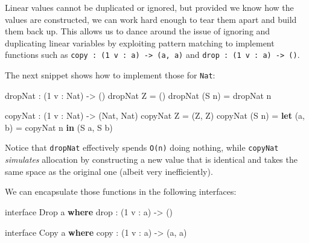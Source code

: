 \documentclass[
]{article}
\newenvironment{Shaded}{}{}
\newcommand{\DataTypeTok}[1]{\textcolor[rgb]{0.56,0.13,0.00}{#1}}
\newcommand{\DecValTok}[1]{\textcolor[rgb]{0.25,0.63,0.44}{#1}}
\newcommand{\FunctionTok}[1]{\textcolor[rgb]{0.02,0.16,0.49}{#1}}
\newcommand{\KeywordTok}[1]{\textcolor[rgb]{0.00,0.44,0.13}{\textbf{#1}}}
\newcommand{\NormalTok}[1]{#1}
\newcommand{\OperatorTok}[1]{\textcolor[rgb]{0.40,0.40,0.40}{#1}}
\newcommand{\OtherTok}[1]{\textcolor[rgb]{0.00,0.44,0.13}{#1}}
\begin{document}
Linear values cannot be duplicated or ignored, but provided we know how
the values are constructed, we can work hard enough to tear them apart
and build them back up. This allows us to dance around the issue of
ignoring and duplicating linear variables by exploiting pattern matching
to implement functions such as
\texttt{copy\ :\ (1\ v\ :\ a)\ -\textgreater{}\ (a,\ a)} and
\texttt{drop\ :\ (1\ v\ :\ a)\ -\textgreater{}\ ()}.

The next snippet shows how to implement those for \texttt{Nat}:

\begin{Shaded}
\begin{Highlighting}[]
\NormalTok{dropNat }\OperatorTok{:}\NormalTok{ (}\DecValTok{1}\NormalTok{ v }\OperatorTok{:} \DataTypeTok{Nat}\NormalTok{) }\OtherTok{{-}\textgreater{}}\NormalTok{ ()}
\NormalTok{dropNat }\DataTypeTok{Z} \OtherTok{=}\NormalTok{ ()}
\NormalTok{dropNat (}\DataTypeTok{S}\NormalTok{ n) }\OtherTok{=}\NormalTok{ dropNat n}

\NormalTok{copyNat }\OperatorTok{:}\NormalTok{ (}\DecValTok{1}\NormalTok{ v }\OperatorTok{:} \DataTypeTok{Nat}\NormalTok{) }\OtherTok{{-}\textgreater{}}\NormalTok{ (}\DataTypeTok{Nat}\NormalTok{, }\DataTypeTok{Nat}\NormalTok{)}
\NormalTok{copyNat }\DataTypeTok{Z} \OtherTok{=}\NormalTok{ (}\DataTypeTok{Z}\NormalTok{, }\DataTypeTok{Z}\NormalTok{)}
\NormalTok{copyNat (}\DataTypeTok{S}\NormalTok{ n) }\OtherTok{=} \KeywordTok{let}\NormalTok{ (a, b) }\OtherTok{=}\NormalTok{ copyNat n }\KeywordTok{in}
\NormalTok{                    (}\DataTypeTok{S}\NormalTok{ a, }\DataTypeTok{S}\NormalTok{ b)}
\end{Highlighting}
\end{Shaded}

Notice that \texttt{dropNat} effectively spends \texttt{O(n)} doing
nothing, while \texttt{copyNat} \emph{simulates} allocation by
constructing a new value that is identical and takes the same space as
the original one (albeit very inefficiently).

We can encapsulate those functions in the following interfaces:

\begin{Shaded}
\begin{Highlighting}[]
\NormalTok{interface }\DataTypeTok{Drop}\NormalTok{ a }\KeywordTok{where}
    \FunctionTok{drop} \OperatorTok{:}\NormalTok{ (}\DecValTok{1}\NormalTok{ v }\OperatorTok{:}\NormalTok{ a) }\OtherTok{{-}\textgreater{}}\NormalTok{ ()}

\NormalTok{interface }\DataTypeTok{Copy}\NormalTok{ a }\KeywordTok{where}
\NormalTok{    copy }\OperatorTok{:}\NormalTok{ (}\DecValTok{1}\NormalTok{ v }\OperatorTok{:}\NormalTok{ a) }\OtherTok{{-}\textgreater{}}\NormalTok{ (a, a)}
\end{Highlighting}
\end{Shaded}
\end{document}
